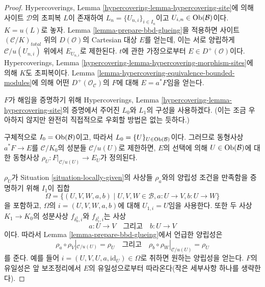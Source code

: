 \begin{proof}
Hypercoverings, Lemma \ref{hypercovering-lemma-hypercovering-site}에 의해
사이트 $\mathcal{D}$의 초피복 $L$이 존재하여
$L_n = \{U_{n, i}\}_{i \in I_n}$이고
$U_{i, n} \in \mathop{\mathrm{Ob}}\nolimits(\mathcal{B})$이다. $K = u(L)$로 놓자.
Lemma \ref{lemma-prepare-bbd-glueing}을 적용하면 사이트
$(\mathcal{C}/K)_{total}$ 위의 $D(\mathcal{O})$의 Cartesian 대상 $E$를
얻는데, 이는 서로 양립하게 $\mathcal{C}/u(U_{n, i})$ 위에서
$E_{U_{n, i}}$로 제한된다. $t$에 관한 가정으로부터
$E \in D^+(\mathcal{O})$이다. Hypercoverings, Lemma
\ref{hypercovering-lemma-hypercovering-morphism-sites}에 의해 $K$도
초피복이다. Lemma \ref{lemma-hypercovering-equivalence-bounded-modules}에
의해 어떤 $D^+(\mathcal{O}_\mathcal{C})$의 $F$에 대해
$E = a^*F$임을 얻는다.

\medskip\noindent
$F$가 해임을 증명하기 위해 Hypercoverings, Lemma
\ref{hypercovering-lemma-hypercovering-site}의 증명에서 주어진
$L_0$와 $L_1$의 구성을 사용하겠다.
(이는 조금 우아하지 않지만 완전히 직접적으로 우회할 방법은 없는 듯하다.)

\medskip\noindent
구체적으로 $I_0 = \mathop{\mathrm{Ob}}\nolimits(\mathcal{B})$이고, 따라서
$L_0 = \{U\}_{U \in \mathop{\mathrm{Ob}}\nolimits(\mathcal{B})}$이다. 그러므로 동형사상
$a^*F \to E$를 $\mathcal{C}/K_0$의 성분들
$\mathcal{C}/u(U)$로 제한하면, $E$의 선택에 의해
$U \in \mathop{\mathrm{Ob}}\nolimits(\mathcal{B})$에 대한 동형사상
$\rho_U : F|_{\mathcal{C}/u(U)} \to E_U$가 정의된다.

\medskip\noindent
$\rho_U$가 Situation \ref{situation-locally-given}의 사상들 $\rho_a$와의
양립성 조건을 만족함을 증명하기 위해 $I_1$이 집합
$$
\Omega =
\{(U, V, W, a, b) \mid U, V, W \in \mathcal{B}, a : U \to V, b : U \to W\}
$$
을 포함하고, $\Omega$의 $i = (U, V, W, a, b)$에 대해
$U_{1, i} = U$임을 사용한다. 또한 두 사상 $K_1 \to K_0$의 성분사상
$f_{\delta^1_0, i}$와 $f_{\delta^1_1, i}$는 사상
$$
a : U \to V \quad\text{그리고}\quad b : U \to V
$$
이다. 따라서 Lemma \ref{lemma-prepare-bbd-glueing}에서 언급한 양립성은
$$
\rho_a \circ \rho_V|_{\mathcal{C}/u(U)} = \rho_U
\quad\text{그리고}\quad
\rho_b \circ \rho_W|_{\mathcal{C}/u(U)} = \rho_U
$$
를 준다. 예를 들어 $i = (U, V, U, a, \text{id}_U) \in \Omega$로
취하면 원하는 양립성을 얻는다. $F$의 유일성은 앞 보조정리에서 $E$의
유일성으로부터 따라온다(작은 세부사항 하나를 생략한다).
\end{proof}

